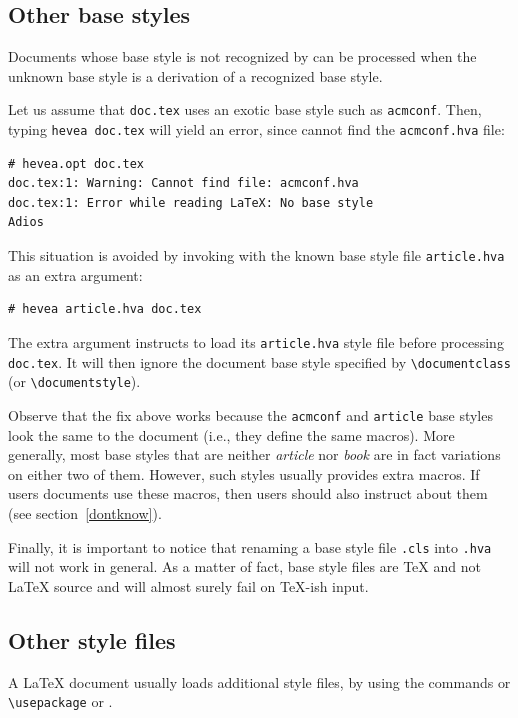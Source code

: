 \subsection{Other base styles}\label{otherbase}
Documents whose base style is not recognized by \hevea{} can be
processed when the unknown base style is a derivation of a
recognized base style.

Let us assume that \texttt{doc.tex} uses an exotic
base style such as \texttt{acmconf}. Then, typing
\verb+hevea doc.tex+ will yield an error, since
\hevea{} cannot find the \texttt{acmconf.hva} file:
\begin{verbatim}
# hevea.opt doc.tex
doc.tex:1: Warning: Cannot find file: acmconf.hva
doc.tex:1: Error while reading LaTeX: No base style
Adios
\end{verbatim}


This situation is avoided by invoking \hevea{} with the known
base style file  \texttt{article.hva} as an extra argument:
\begin{verbatim}
# hevea article.hva doc.tex
\end{verbatim}
The extra argument instructs
\hevea{} to load its \texttt{article.hva}
style file before processing \texttt{doc.tex}.
It will then ignore the document base style specified by
\verb+\documentclass+ (or \verb+\documentstyle+).

Observe that the fix above works because the \texttt{acmconf} and
\texttt{article} base styles look the same to the document (i.e., they define
the same macros).
More generally, most  base styles that are neither
\textit{article} nor \textit{book} are in fact variations
on either two of them.
However, such styles usually provides extra macros.
If users documents use these macros, then users should also instruct
\hevea{} about them (see section~\ref{dontknow}).


Finally, it is important to notice that
renaming a base style file \verb+.cls+ into
\verb+.hva+ will not work in general.
As a matter of fact, base style files are \TeX{} and not \LaTeX{} source and
\hevea{} will almost surely fail on \TeX-ish input.


\subsection{Other style files}
A \LaTeX{} document usually loads additional style files, by using
the commands  \verb++ or \verb+\usepackage+ or \verb++.



